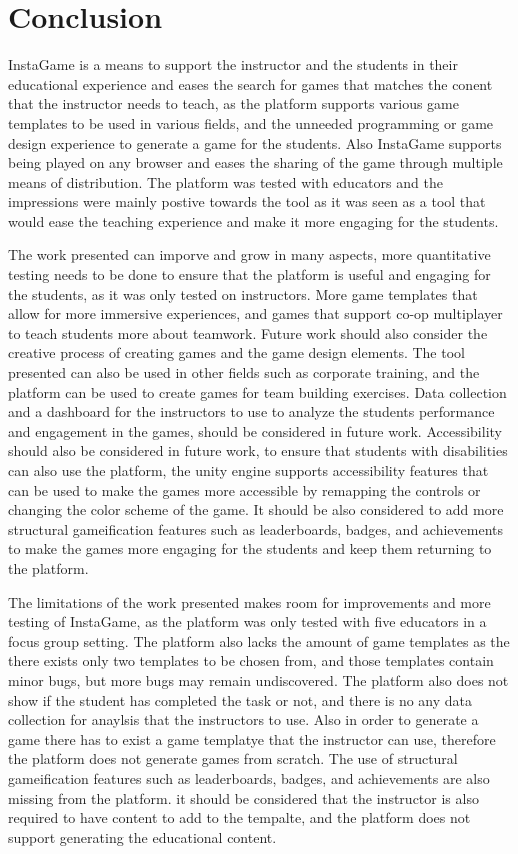 \chapter{Conclusion}\label{chap:concl}
InstaGame is a means to support the instructor and the students in their educational experience and eases the search for games that matches the conent that the instructor needs to teach, as the platform supports various game templates to be used in various fields, and the unneeded programming or game design experience to generate a game for the students. Also InstaGame supports being played on any browser and eases the sharing of the game through multiple means of distribution. The platform was tested with educators and the impressions were mainly postive towards the tool as it was seen as a tool that would ease the teaching experience and make it more engaging for the students. 
 

The work presented can imporve and grow in many aspects, more quantitative testing needs to be done to ensure that the platform is useful and engaging for the students, as it was only tested on instructors. More game templates that allow for more immersive experiences, and games that support co-op multiplayer to teach students more about teamwork. Future work should also consider the creative process of creating games and the game design elements. The tool presented can also be used in other fields such as corporate training, and the platform can be used to create games for team building exercises. Data collection and a dashboard for the instructors to use to analyze the students performance and engagement in the games, should be considered in future work. Accessibility should also be considered in future work, to ensure that students with disabilities can also use the platform, the unity engine supports accessibility features that can be used to make the games more accessible by remapping the controls or changing the color scheme of the game. It should be also considered to add more structural gameification features such as leaderboards, badges, and achievements to make the games more engaging for the students and keep them returning to the platform.


The limitations of the work presented makes room for improvements and more testing of InstaGame, as the platform was only tested with five educators in a focus group setting. The platform also lacks the amount of game templates as the there exists only two templates to be chosen from, and those templates contain minor bugs, but more bugs may remain undiscovered. The platform also does not show if the student has completed the task or not, and there is no any data collection for anaylsis that the instructors to use. Also in order to generate a game there has to exist a game templatye that the instructor can use, therefore the platform does not generate games from scratch. The use of structural gameification features such as leaderboards, badges, and achievements are also missing from the platform. it should be considered that the instructor is also required to have content to add to the tempalte, and the platform does not support generating the educational content. 